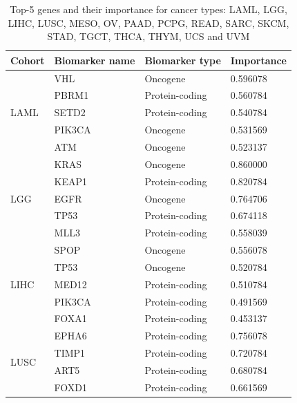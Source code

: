 \begin{table}
    \caption{Top-5 genes and their importance for cancer types: LAML, LGG, LIHC, LUSC, MESO, OV, PAAD, PCPG, READ, SARC, SKCM, STAD, TGCT, THCA, THYM, UCS and UVM}
    \label{table:proteinimportance_2} %
    \begin{center}
    \scriptsize{
    \vspace{-6mm}
    \begin{tabular}{l|l|l|l}
        \toprule
        \textbf{Cohort} & \textbf{Biomarker name} & \textbf{Biomarker type} & \textbf{Importance} \\ 
        \midrule
        \multirow{5}{*}{LAML} & VHL & Oncogene & 0.596078 \\ %
        & PBRM1 & Protein-coding  & 0.560784 \\ %
        & SETD2 & Protein-coding & 0.540784 \\ %
        & PIK3CA & Oncogene & 0.531569 \\ %
        & ATM & Oncogene & 0.523137 \\ %
        \midrule
        \multirow{5}{*}{LGG}& KRAS & Oncogene & 0.860000 \\ %
        & KEAP1 & Protein-coding & 0.820784 \\ %
        & EGFR & Oncogene & 0.764706 \\ %
        & TP53 & Protein-coding & 0.674118 \\ %
        & MLL3 & Protein-coding & 0.558039 \\ %
        \midrule
        \multirow{5}{*}{LIHC}& SPOP & Oncogene & 0.556078 \\ %
        & TP53 & Oncogene & 0.520784 \\ %
        & MED12 & Protein-coding & 0.510784 \\ %
        & PIK3CA & Protein-coding & 0.491569 \\ %
        & FOXA1 & Protein-coding & 0.453137 \\ %
        \midrule
        \multirow{5}{*}{LUSC}& EPHA6 & Protein-coding & 0.756078 \\ %
        & TIMP1 & Protein-coding & 0.720784 \\ %
        & ART5 & Protein-coding & 0.680784 \\ %
        & FOXD1 & Protein-coding & 0.661569 \\ %

\end{tabular}}
\end{center}
\end{table}
